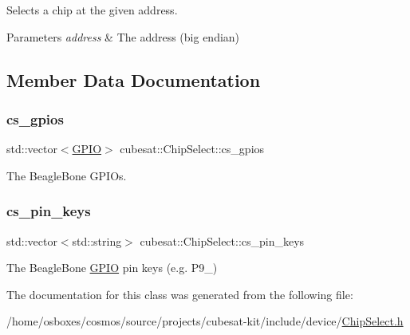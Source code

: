 Selects a chip at the given address. 


\begin{DoxyParams}{Parameters}
{\em address} & The address (big endian) \\
\hline
\end{DoxyParams}


\subsection{Member Data Documentation}
\mbox{\label{classcubesat_1_1ChipSelect_a549f890313f33099ac514679d86501a4}} 
\subsubsection{\texorpdfstring{cs\+\_\+gpios}{cs\_gpios}}
{\footnotesize\ttfamily std\+::vector$<$\hyperlink{classcubesat_1_1GPIO}{G\+P\+IO}$>$ cubesat\+::\+Chip\+Select\+::cs\+\_\+gpios\hspace{0.3cm}{\ttfamily [private]}}



The Beagle\+Bone G\+P\+I\+Os. 

\mbox{\label{classcubesat_1_1ChipSelect_ae6285a5edb25a1dbecce248bf1ac241d}} 
\subsubsection{\texorpdfstring{cs\+\_\+pin\+\_\+keys}{cs\_pin\_keys}}
{\footnotesize\ttfamily std\+::vector$<$std\+::string$>$ cubesat\+::\+Chip\+Select\+::cs\+\_\+pin\+\_\+keys\hspace{0.3cm}{\ttfamily [private]}}



The Beagle\+Bone \hyperlink{classcubesat_1_1GPIO}{G\+P\+IO} pin keys (e.\+g. P9\+\_) 



The documentation for this class was generated from the following file\+:\begin{DoxyCompactItemize}
\item 
/home/osboxes/cosmos/source/projects/cubesat-\/kit/include/device/\hyperlink{ChipSelect_8h}{Chip\+Select.\+h}\end{DoxyCompactItemize}
